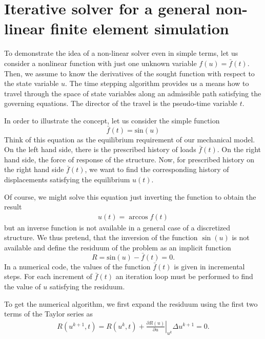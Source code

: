 \documentclass[main.tex]{subfiles}
\begin{document}
\section{Iterative solver for a general non-linear finite element simulation}
\label{SEC:nonlinear_solver}

To demonstrate the idea of a non-linear solver even in simple terms, let us consider a nonlinear function with just one unknown variable $f(u) = \bar{f}(t)$. 
Then, we assume to know the derivatives of the sought function with respect to the state variable $u$. The time stepping algorithm provides us a means how to travel through the space of state variables along an admissible path satisfying the governing equations. The director of the travel is the pseudo-time variable $t$.

In order to illustrate the concept, let us consider the simple function 
\begin{equation}
\bar{f}(t)= \mathrm{sin}(u)
\end{equation}
Think of this equation as the equilibrium requirement of our mechanical model. On the left hand side, there is the prescribed history of loads $\bar{f}(t)$. On the right hand side, the force of response of the structure. Now, for prescribed history on the right hand side $\bar{f}(t)$, we want to find the corresponding history of displacements satisfying the equilibrium $u(t)$. 

Of course, we might solve this equation just inverting the function to obtain the result
\begin{align}
u(t) = \arccos{f(t)}
\end{align}
but an inverse function is not available in a general case of a discretized structure. 
We thus pretend, that the inversion of the function $\sin(u)$ is not available and define the residuum of the problem as an implicit function
\begin{equation} \label{eq:residuum}
R = \mathrm{sin}(u) - \bar{f}(t) = 0.
\end{equation}
In a numerical code, the values of the function $\bar{f}(t)$ is given in incremental steps.
For each increment of $\bar{f}(t)$ an iteration loop must be performed to find the value of $u$ satisfying the residuum.

To get the numerical algorithm, we first expand the residuum using the first two terms of the Taylor series as
\begin{align}
R(u^{k+1},t) = R(u^{k},t) + \left.\frac{ \partial R(u) }{ \partial u }\right|_{u^k} \Delta u^{k+1} = 0.
\end{align}
\end{document}
